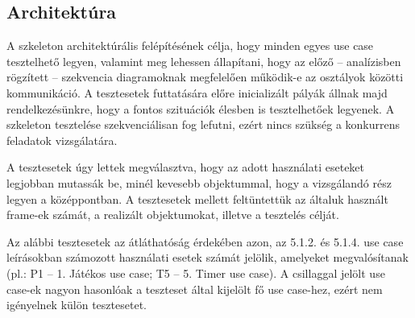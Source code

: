 	\subsection{Architektúra}
		A szkeleton architektúrális felépítésének célja, hogy minden egyes use case tesztelhető legyen, valamint meg lehessen állapítani, hogy az előző -- analízisben rögzített -- szekvencia diagramoknak megfelelően működik-e az osztályok közötti kommunikáció. A tesztesetek futtatására előre inicializált pályák állnak majd rendelkezésünkre, hogy a fontos szituációk élesben is tesztelhetőek legyenek. A szkeleton tesztelése szekvenciálisan fog lefutni, ezért nincs szükség a konkurrens feladatok vizsgálatára.
		
		A tesztesetek úgy lettek megválasztva, hogy az adott használati eseteket legjobban mutassák be, minél kevesebb objektummal, hogy a vizsgálandó rész legyen a középpontban. A tesztesetek mellett feltüntettük az általuk használt frame-ek számát, a realizált objektumokat, illetve a tesztelés célját.
		
		Az alábbi tesztesetek az átláthatóság érdekében azon, az 5.1.2. és 5.1.4. use case leírásokban számozott használati esetek számát jelölik, amelyeket megvalósítanak (pl.: P1 -- 1. Játékos use case; T5 -- 5. Timer use case). A csillaggal jelölt use case-ek nagyon hasonlóak a teszteset által kijelölt fő use case-hez, ezért nem igényelnek külön tesztesetet.
								

